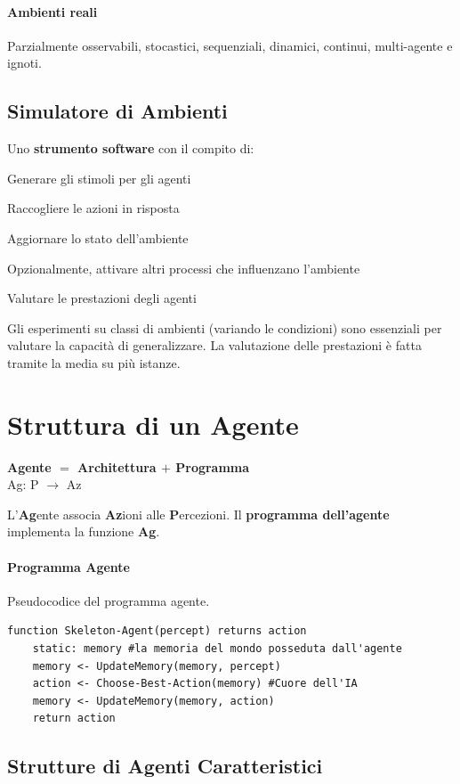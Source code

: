 \documentclass[10pt]{book}
\begin{document}
\paragraph{Ambienti reali} Parzialmente osservabili, stocastici, sequenziali, dinamici, continui, multi-agente e ignoti.
\subsection{Simulatore di Ambienti}
Uno \textbf{strumento software} con il compito di:
\begin{list}{}{}
	\item Generare gli stimoli per gli agenti
	\item Raccogliere le azioni in risposta
	\item Aggiornare lo stato dell'ambiente
	\item Opzionalmente, attivare altri processi che influenzano l'ambiente
	\item Valutare le prestazioni degli agenti
\end{list}
Gli esperimenti su classi di ambienti (variando le condizioni) sono essenziali per valutare la capacità di generalizzare. La valutazione delle prestazioni è fatta tramite la media su più istanze.
\section{Struttura di un Agente}
\begin{center}
\textbf{Agente $=$ Architettura $+$ Programma}\\
Ag: P $\longrightarrow$ Az
\end{center}
L'\textbf{Ag}ente associa \textbf{Az}ioni alle \textbf{P}ercezioni. Il \textbf{programma dell'agente} implementa la funzione \textbf{Ag}.
\paragraph{Programma Agente} Pseudocodice del programma agente.
\begin{center}
\begin{lstlisting}
function Skeleton-Agent(percept) returns action
	static: memory #la memoria del mondo posseduta dall'agente
	memory <- UpdateMemory(memory, percept)
	action <- Choose-Best-Action(memory) #Cuore dell'IA
	memory <- UpdateMemory(memory, action)
	return action
\end{lstlisting}
\end{center}
\subsection{Strutture di Agenti Caratteristici}
\end{document}
